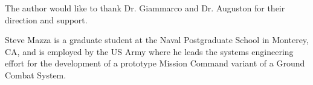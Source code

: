 \documentclass[journal]{IEEEtran}
\begin{document}
\appendix[Acknowledgment]
The author would like to thank Dr. Giammarco and Dr. Auguston 
for their direction and support.


%


% 

\begin{IEEEbiographynophoto}{Steve Mazza}
is a graduate student at the Naval Postgraduate School in Monterey, CA, and
is employed by the US Army where he leads the systems engineering effort for the 
development of a prototype Mission Command variant of a Ground Combat System.
\end{IEEEbiographynophoto}
\end{document}
